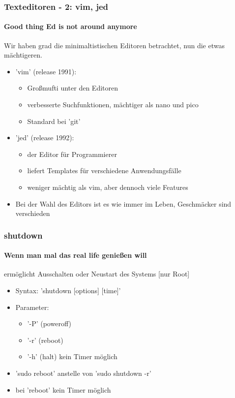 \documentclass[12pt,utf8]{beamer}
\begin{document}
\begin{frame}
\frametitle{Texteditoren - 2: vim, jed}
\framesubtitle{Good thing Ed is not around anymore}
Wir haben grad die minimaltistischen Editoren betrachtet, nun die etwas mächtigeren.
\begin{itemize}
	\item 'vim' (release 1991):
	\begin{itemize}[<+->]
		\item Großmufti unter den Editoren
		\item verbesserte Suchfunktionen, mächtiger als nano und pico
		\item Standard bei 'git'
	\end{itemize}
	\item 'jed' (release 1992):
	\begin{itemize}[<+->]
		\item der Editor für Programmierer
		\item liefert Templates für verschiedene Anwendungsfälle
		\item weniger mächtig als vim, aber dennoch viele Features
	\end{itemize}
	\item Bei der Wahl des Editors ist es wie immer im Leben, Geschmäcker sind verschieden
\end{itemize}
\end{frame}

\begin{frame}
\frametitle{shutdown}
\framesubtitle{Wenn man mal das real life genießen will}
ermöglicht Ausschalten oder Neustart des Systems [nur Root]
\begin{itemize}[<+->]
	\item Syntax: 'shutdown [options] [time]'
	\item Parameter:
	\begin{itemize}[<+->]
		\item '-P' (poweroff)
		\item '-r' (reboot) 
		\item '-h' (halt) kein Timer möglich
	\end{itemize}
	\item 'sudo reboot' anstelle von 'sudo shutdown -r'
	\item bei 'reboot' kein Timer möglich
\end{itemize}
\end{frame}
\end{document}
